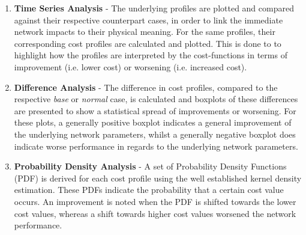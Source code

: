 \begin{enumerate}
	\item \textbf{Time Series Analysis} - 
	The underlying profiles are plotted and compared against their respective counterpart cases, in order to link the immediate network impacts to their physical meaning.
	For the same profiles, their corresponding cost profiles are calculated and plotted.
	This is done to to highlight how the profiles are interpreted by the cost-functions in terms of improvement (i.e. lower cost) or worsening (i.e. increased cost).
	\item \textbf{Difference Analysis} - 
	The difference in cost profiles, compared to the respective \textit{base} or \textit{normal} case, is calculated and boxplots of these differences are presented to show a statistical spread of improvements or worsening.
	For these plots, a generally positive boxplot indicates a general improvement of the underlying network parameters, whilst a generally negative boxplot does indicate worse performance in regards to the underlying network parameters.
	\item \textbf{Probability Density Analysis} - 
	A set of Probability Density Functions (PDF) is derived for each cost profile using the well established kernel density estimation.
	These PDFs indicate the probability that a certain cost value occurs.
	An improvement is noted when the PDF is shifted towards the lower cost values, whereas a shift towards higher cost values worsened the network performance.
\end{enumerate}





